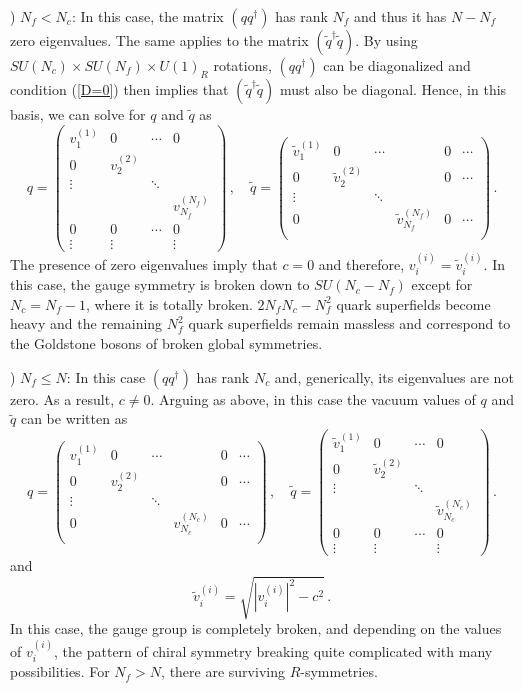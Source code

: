 ) $N_f < N_c$: In this case, the matrix $(qq^\dagger)$ has
rank $N_f$ and thus it has $N-N_f$ zero eigenvalues. The same applies to
the matrix $(\widetilde q^\dagger\widetilde q)$. By using $SU(N_c)\times
SU(N_f)\times U(1)_R$ rotations, $(qq^\dagger)$ can be diagonalized and
condition (\ref{D=0}) then implies that $(\widetilde
q^\dagger\widetilde q)$ must also be diagonal. Hence, in this basis, we
can solve for $q$ and $\widetilde q$ as
$$
q = \left(
\begin{array}{cccc}
v^{(1)}_1 & 0 &\cdots&0\\
0 & v^{(2)}_2 &&\\
\vdots&&\ddots & \\
&&&v^{(N_f)}_{N_f}\\
0&0&\cdots&0\\
\vdots&\vdots&&\vdots
\end{array}
\right)\,, \quad
\widetilde q = \left(
\begin{array}{cccccc}
\tilde v^{(1)}_1 & 0 & \cdots & & 0 & \cdots \\
 0 & \tilde v^{(2)}_2 & & & 0 & \cdots \\
\vdots  & & \ddots &  &   &  \\
 0 & & &\tilde v^{(N_f)}_{N_f} & 0 & \cdots  \\
\end{array}
\right)\,.
$$
The presence of zero eigenvalues imply that $c = 0$ and therefore,
$v^{(i)}_i =\tilde{v}^{(i)}_i$. In this case, the gauge symmetry is
broken down to $SU(N_c-N_f)$ except for $N_c=N_f-1$, where it is
totally broken. $2N_fN_c-N^2_f$ quark superfields become heavy and the
remaining $N^2_f$ quark superfields remain massless and correspond to
the Goldstone bosons of broken global symmetries.  

) $N_f \leq N$:  In this case $(qq^\dagger)$
has rank $N_c$ and, generically, its eigenvalues are not zero. As a
result, $c\not=0$. Arguing as above, in this case the vacuum values
of $q$ and $\widetilde q$ can be written as  
$$
q = \left(
\begin{array}{cccccc}
v^{(1)}_1 & 0 & \cdots & & 0 & \cdots \\
 0 & v^{(2)}_2 & & & 0 & \cdots \\
\vdots  & & \ddots &  &   &  \\
 0 & & & v^{(N_c)}_{N_c} & 0 & \cdots  \\
\end{array}
\right)\,,\quad
\widetilde q = \left(
\begin{array}{cccc}
\tilde v^{(1)}_1 & 0 &\cdots&0\\
0 &\tilde v^{(2)}_2 &&\\
\vdots&&\ddots & \\
&&&\tilde v^{(N_c)}_{N_c}\\
0&0&\cdots&0\\
\vdots&\vdots&&\vdots
\end{array}
\right)\,.
$$
and
$$
\tilde{v}_{i}^{(i)} = \sqrt{|v_{i}^{(i)}|^2 - c^2} \, .
$$
In this case, the gauge group is completely broken, and depending
on the values of $v_{i}^{(i)}$, the pattern of chiral symmetry
breaking quite complicated with many possibilities.
For $N_f > N$, there are surviving $R$-symmetries. 

